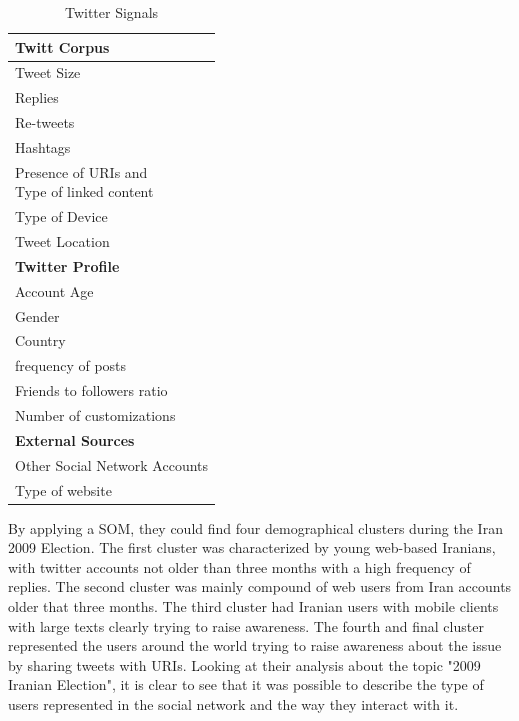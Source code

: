 \begin{table}[H]
  \caption{Twitter Signals}
  \label{tab:twitter_signals}
  \begin{center}
    \begin{tabular}{|l|}
      \hline
      \textbf{Twitt Corpus}  \\
      \hline
      Tweet Size \\
      \hline
      Replies \\
      \hline
      Re-tweets \\
      \hline
      Hashtags  \\
      \hline
      \specialcell{Presence of URIs and \\ Type of linked content} \\
      \hline
      Type of Device   \\
      \hline
      Tweet Location  \\
      \hline                 
      \hline                 
      \textbf{Twitter Profile} \\ 
      \hline
      Account Age   \\
      \hline
      Gender     \\
      \hline
      Country \\    
      \hline
      frequency of posts \\
      \hline
      Friends to followers ratio \\ 
      \hline
      Number of  customizations \\   
      \hline
      \hline
      \textbf{External Sources} \\
      \hline
      Other Social Network Accounts   \\
      \hline
      Type of website\\ 
      \hline
    \end{tabular}
  \end{center}
\end{table}

By applying a \ac{SOM}, they could find four demographical clusters during the Iran 2009 Election. The first cluster was characterized by young web-based Iranians, with twitter accounts not older than three months with a high frequency of replies. The second cluster was mainly compound of web users from Iran accounts older that three months. The third cluster had Iranian users with mobile clients with large texts clearly trying to raise awareness. The fourth and final cluster represented the users around the world trying to raise awareness about the issue by sharing tweets with URIs.
Looking at their analysis about the topic "2009 Iranian Election", it is clear to see that it was possible to describe the type of users represented in the social network and the way they interact with it.


